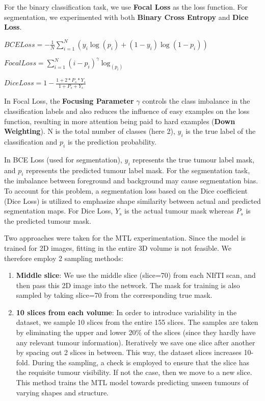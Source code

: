 For the binary classification task, we use \textbf{Focal Loss} as the loss function. For segmentation, we experimented with both \textbf{Binary Cross Entropy} and \textbf{Dice Loss}. 
\vspace*{3mm}
\begin{center}
    $ BCE Loss= -\displaystyle\frac{1}{N}\displaystyle\sum\limits_{i=1}^N  (y_i\log(p_i) + (1 - y_i)\log(1 - p_i))$
    \vspace*{3mm}
    
   $Focal Loss = \displaystyle\sum\limits_{i=1}^N (i-p_i)^{\gamma}\log_(p_i)$
\vspace*{3mm}

$Dice Loss = 1 - \displaystyle\frac{1 + 2*P_s*Y_s}{1 + P_s + Y_s}$
   
    
\end{center}
\vspace*{3mm}

In Focal Loss, the \textbf{Focusing Parameter} $\gamma$ controls the class imbalance in the classification labels and also reduces the influence of easy examples on the loss function, resulting in more attention being paid to hard examples (\textbf{Down Weighting}). N is the total number of classes (here 2), $y_i$ is the true label of the classification and $p_i$ is the prediction probability.
\vspace*{3mm}

In BCE Loss (used for segmentation), $y_i$ represents the true tumour label mask, and $p_i$ represents the predicted tumour label mask. For the segmentation task, the imbalance between foreground and background may cause segmentation bias. To account for this problem, a segmentation loss based on the Dice coefficient (Dice Loss) is utilized to emphasize shape similarity between actual and predicted segmentation maps. For Dice Loss, $Y_s$ is the actual tumour mask whereas $P_s$ is the predicted tumour mask. 
\vspace*{3mm}

Two approaches were taken for the MTL experimentation. Since the model is trained for 2D images, fitting in the entire 3D volume is not feasible. We therefore employ 2 sampling methods:

\begin{enumerate}
    \item \textbf{Middle slice}: We use the middle slice (slice=70) from each NIfTI scan, and then pass this 2D image into the network. The mask for training is also sampled by taking slice=70 from the corresponding true mask.
    \item \textbf{10 slices from each volume}: In order to introduce variability in the dataset, we sample 10 slices from the entire 155 slices. The samples are taken by eliminating the upper and lower 20\% of the slices (since they hardly have any relevant tumour information). Iteratively we save one slice after another by spacing out 2 slices in between. This way, the dataset slices increases 10-fold. During the sampling, a check is employed to ensure that the slice has the requisite tumour visibility. If not the case, then we move to a new slice. This method trains the MTL model towards predicting unseen tumours of varying shapes and structure.
\end{enumerate}


